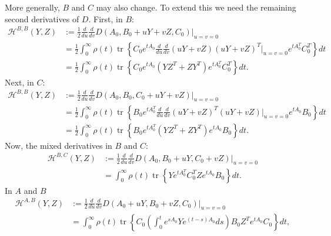 \documentclass{article}
\newcommand{\tr}{\mathop{\mbox{tr}}} %
\newcommand{\1}{\mathbbm{1}}
\begin{document}
More generally, $B$ and $C$ may also change.
To extend this we need the remaining second derivatives of $D$.
First, in $B$:
\begin{equation}
    \begin{aligned}
        \mathcal{H}^{B,B}(Y,Z)
        &:= 
        \frac{1}{2} \frac{d}{du} \frac{d}{dv} D(A_0,B_0+uY+vZ,C_0)\vert_{u=v=0} \\
        &=
        \frac{1}{2} \int_0^\infty \rho(t) \tr\left\{ 
        C_0 e^{t A_0}
        \frac{d}{du} \frac{d}{dv} 
        (uY+vZ)
        (uY+vZ)^T
        \vert_{u=v=0} 
        e^{t A_0^T} C_0^T 
        \right\} dt  \\
        &=
        \frac{1}{2} \int_0^\infty \rho(t) \tr\left\{ 
        C_0 e^{t A_0}
        \left( Y Z^T + Z Y^T \right)
        e^{t A_0^T} C_0^T 
        \right\} dt  .
  \end{aligned}
\end{equation}
Next, in $C$:
\begin{equation}
    \begin{aligned}
        \mathcal{H}^{B,B}(Y,Z)
        &:= 
        \frac{1}{2} \frac{d}{du} \frac{d}{dv} D(A_0,B_0,C_0+uY+vZ)\vert_{u=v=0} \\
        &=
        \frac{1}{2} \int_0^\infty \rho(t) \tr\left\{ 
        B_0 e^{t A_0^T}
        \frac{d}{du} \frac{d}{dv} 
        (uY+vZ)^T
        (uY+vZ)
        \vert_{u=v=0} 
        e^{t A_0} B_0
        \right\} dt  \\
        &=
        \frac{1}{2} \int_0^\infty \rho(t) \tr\left\{ 
        B_0 e^{t A_0^T}
        \left( Y Z^T + Z Y^T \right)
        e^{t A_0} B_0
        \right\} dt  .
  \end{aligned}
\end{equation}
Now, the mixed derivatives in $B$ and $C$:
\begin{equation}
    \begin{aligned}
        \mathcal{H}^{B,C}(Y,Z)
        &:= 
        \frac{1}{2} \frac{d}{du} \frac{d}{dv} D(A_0,B_0+uY,C_0+vZ)\vert_{u=v=0} \\
        &=
        \int_0^\infty \rho(t) \tr\left\{ 
        Y e^{t A_0^T} C_0^T Z e^{t A_0} B_0
        \right\} dt  .
  \end{aligned}
\end{equation}
In $A$ and $B$
\begin{equation}
    \begin{aligned}
        \mathcal{H}^{A,B}(Y,Z)
        &:= 
        \frac{1}{2} \frac{d}{du} \frac{d}{dv} D(A_0+uY,B_0+vZ,C_0)\vert_{u=v=0} \\
        &=
        \int_0^\infty \rho(t) \tr\left\{ 
        C_0 \left(\int_0^t e^{s A_0} Y e^{(t-s) A_0} ds \right) B_0
        Z^T e^{t A_0} C_0
        \right\} dt  ,
  \end{aligned}
\end{equation}
\end{document}
